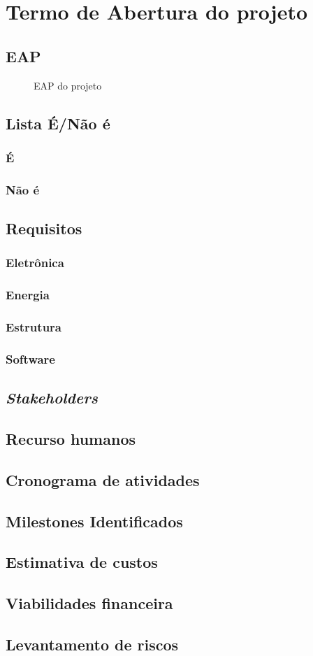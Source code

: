 \chapter{Termo de Abertura do projeto}

\section{EAP}
\begin{figure}[!htb]
    \caption{\label{fig:eap} EAP do projeto}
\end{figure}
\section{Lista É/Não é}
\subsection{É}
\subsection{Não é}
\section{Requisitos}
\subsection{Eletrônica}
\subsection{Energia}
\subsection{Estrutura}
\subsection{Software}
\section{\emph{Stakeholders}}
\section{Recurso humanos}
\section{Cronograma de atividades}
\section{Milestones Identificados}
\section{Estimativa de custos}
\section{Viabilidades financeira}
\section{Levantamento de riscos}
